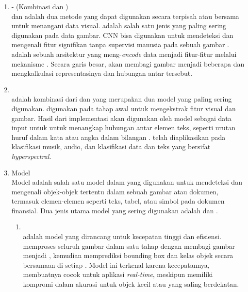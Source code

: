 \begin{enumerate}
	\item \cnn\--\transformer{} (Kombinasi \cnn{} dan \transformer)~\\
	      \cnn{} dan \transformer{} adalah dua metode yang dapat digunakan secara terpisah atau bersama untuk menangani data visual. \cnn{} adalah salah satu jenis \MakeLowercase{{\nn{}}} yang paling sering digunakan pada data gambar. CNN bisa digunakan untuk mendeteksi dan mengenali fitur signifikan tanpa supervisi manusia pada sebuah gambar \parencite{alzubaidi2021review}. \transformer{} adalah sebuah arsitektur \MakeLowercase{\nn{}} yang meng-\emph{encode} data menjadi fitur-fitur melalui mekanisme \attention. Secara garis besar, \transformer{} akan membagi gambar menjadi beberapa \patch{} dan mengkalkulasi representasinya dan hubungan antar \patch{} tersebut. \parencite{han2021transformer}
	\item \crnnfull~\\
	      \crnn{} adalah kombinasi dari \cnn{} dan \rnn{} yang merupakan dua model yang paling sering digunakan. \cnn{} digunakan pada tahap awal untuk mengekstrak fitur visual dan gambar. Hasil dari implementasi \cnn{} akan digunakan oleh model \rnn{} sebagai data input untuk untuk menangkap hubungan antar elemen teks, seperti urutan huruf dalam kata atau angka dalam bilangan \parencite{wang2019convolutional}. \crnn{} telah diaplikasikan pada klasifikasi musik, audio, dan klasifikasi data dan teks yang bersifat \emph{hyperspectral}.
	\item Model \objectdetection~\\
	      Model \objectdetection{} adalah salah satu model dalam \dl{} yang digunakan untuk mendeteksi dan mengenali objek-objek tertentu dalam sebuah gambar atau dokumen, termasuk elemen-elemen seperti teks, tabel, atau simbol pada dokumen finansial. Dua jenis utama model \objectdetection{} yang sering digunakan adalah \yolofull{} dan \rcnnfull{}.
	      \begin{enumerate}
		      \item \yolo~\\
		            \yolo{} adalah model \objectdetection{} yang dirancang untuk kecepatan tinggi dan efisiensi. \yolo{} memproses seluruh gambar dalam satu tahap dengan membagi gambar menjadi \grid{}, kemudian memprediksi bounding box dan kelas objek secara bersamaan di setiap \grid{} \parencite{diwan2023object}. Model ini terkenal karena kecepatannya, membuatnya cocok untuk aplikasi \emph{real-time}, meskipun memiliki  kompromi dalam akurasi untuk objek kecil atau yang saling berdekatan.

\end{enumerate}
\end{enumerate}
